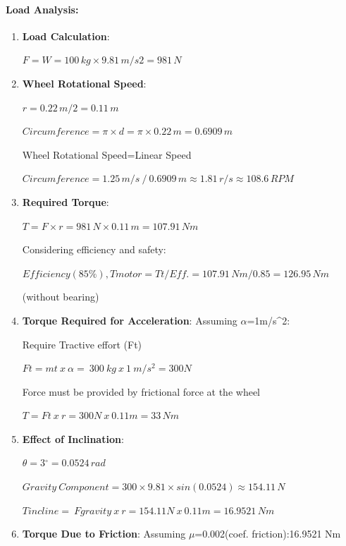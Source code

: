 \documentclass[../../main]{subfiles}
\begin{document}
\paragraph{Load Analysis:}
\begin{enumerate}
\def\labelenumi{\arabic{enumi}.}
\item
  \textbf{Load Calculation}:
  
  \(F = W = 100\, kg \times 9.81\, m/s2 = 981\, N\)
  
  \item
  \textbf{Wheel Rotational Speed}:
  
  \(r = 0.22\, m/2 = 0.11\, m\)
  
  \(Circumference = \pi \times d = \pi \times 0.22\, m = 0.6909\, m\)
  
  Wheel Rotational Speed=Linear Speed
  
  \(Circumference = 1.25\, m/s\ /\ 0.6909\, m \approx 1.81\, r/s \approx 108.6\, RPM\)
  

\item
  \textbf{Required Torque}:

\(T = F \times r = 981\, N \times 0.11\, m = 107.91\, Nm\)

Considering efficiency and safety:

\(Efficiency(85\%),Tmotor = Tt/Eff. = 107.91\, Nm/0.85 = 126.95\, Nm\)

(without bearing)
\item
\textbf{Torque Required for Acceleration}: Assuming $\alpha$=1m/s\^{}2:

Require Tractive effort (Ft)

\(Ft = mt\ x\ \alpha = \ 300\ kg\ x\ 1\ m/s^{2} = 300N\)

Force must be provided by frictional force at the wheel

\(T = Ft\ x\ r = 300N\ x\ 0.11m = 33\, Nm\)

\item
  \textbf{Effect of Inclination}:

\(\theta = 3{^\circ} = 0.0524\, rad\)

\(Gravity\ Component = 300 \times 9.81 \times sin(0.0524) \approx 154.11\, N\)

\(Tincline = \ Fgravity\ x\ r = 154.11N\ x\ 0.11m = 16.9521\, Nm\,\)

\item
  \textbf{Torque Due to Friction}: Assuming $\mu$=0.002(coef.
  friction):16.9521 Nm
\end{enumerate}
\end{document}
